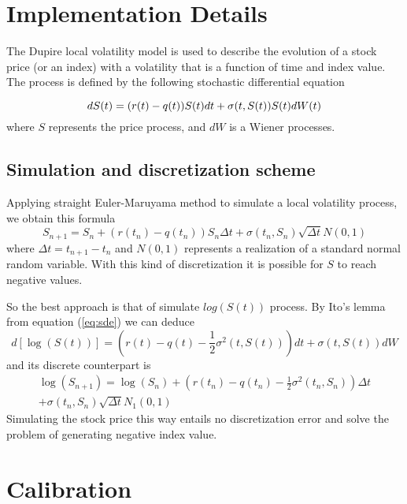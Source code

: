 \section{Implementation Details}

The Dupire local volatility model is used to describe the evolution of a stock price (or an index) with a volatility that is a function of time and index value. The process is defined by the following stochastic differential equation

\begin{equation}
dS(t) = (r(t)-q(t)) S(t)dt + \sigma(t,S(t))S(t)dW(t)\label{eq:sde}\\
\end{equation}
where $S$ represents the price process, and $dW$ is a Wiener processes.

\subsection{Simulation and discretization scheme}

Applying straight Euler-Maruyama method to simulate a local volatility process, we obtain this formula
\begin{equation}
S_{n+1} = S_n + (r(t_n) - q(t_n))S_n\Delta t + \sigma(t_n,S_n)\sqrt{\Delta t} N(0,1)
\end{equation}
where $\Delta t = t_{n+1}-t_n$ and $N(0,1)$ represents a realization of a standard normal random variable. With this kind of discretization it is possible for $S$ to reach negative values.

So the best approach is that of simulate $log(S(t))$ process. By Ito's lemma from equation (\ref{eq:sde}) we can deduce
\begin{equation}
d\left[\log\left(S(t)\right)\right] = \left(r(t) - q(t)- \frac{1}{2}\sigma^2(t, S(t)) \right)dt + \sigma(t, S(t))dW %
\end{equation}
and its discrete counterpart is
\begin{align}
\log(S_{n+1}) = \log(S_n) + \left(r(t_n) - q(t_n) - \frac{1}{2}\sigma^2(t_n, S_n) \right)\Delta t\nonumber\\
 + \sigma(t_n, S_n)\sqrt{\Delta t} N_1(0,1)
\end{align}
Simulating the stock price this way entails no discretization error and solve the problem of generating negative index value.

\section{Calibration}

